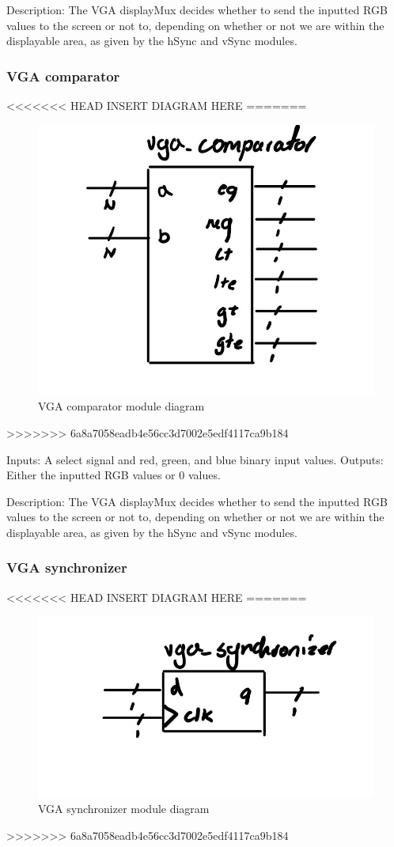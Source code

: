 \documentclass[a4paper]{article}
\begin{document}
Description: The VGA displayMux decides whether to send the inputted RGB values to the screen or not to, depending on whether or not we are within the displayable area, as given by the hSync and vSync modules.

\subsubsection{VGA comparator}

<<<<<<< HEAD
INSERT DIAGRAM HERE
=======
\begin{figure}[H]
    \includegraphics[width=0.8 \linewidth]{images/vga_comparator.JPG}
    \caption{VGA comparator module diagram}
    \label{vgaComparatorDiagram}
\end{figure}
>>>>>>> 6a8a7058eadb4e56cc3d7002e5edf4117ca9b184

Inputs: A select signal and red, green, and blue binary input values.
Outputs: Either the inputted RGB values or 0 values.

Description: The VGA displayMux decides whether to send the inputted RGB values to the screen or not to, depending on whether or not we are within the displayable area, as given by the hSync and vSync modules.

\subsubsection{VGA synchronizer}

<<<<<<< HEAD
INSERT DIAGRAM HERE
=======
\begin{figure}[H]
    \includegraphics[width=0.8 \linewidth]{images/vga_synchronizer.JPG}
    \caption{VGA synchronizer module diagram}
    \label{vgaSynchronizerDiagram}
\end{figure}
>>>>>>> 6a8a7058eadb4e56cc3d7002e5edf4117ca9b184
\end{document}
